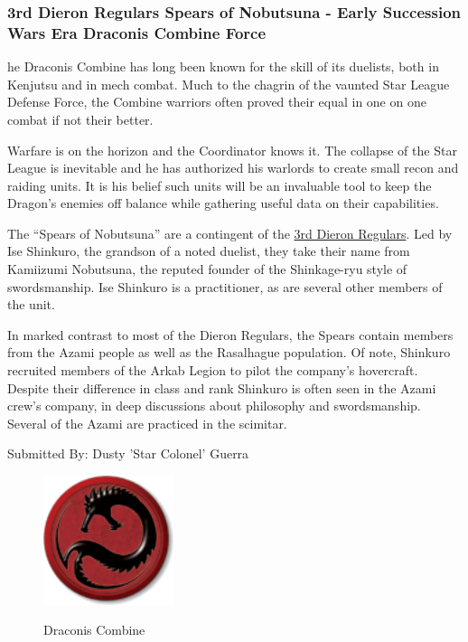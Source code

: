 \subsubsection{3rd Dieron Regulars Spears of Nobutsuna - Early Succession Wars Era Draconis Combine Force}

he Draconis Combine has long been known for the skill of its duelists, both in Kenjutsu and in mech combat.
Much to the chagrin of the vaunted Star League Defense Force, the Combine warriors often proved their equal in one on one combat if not their better.

Warfare is on the horizon and the Coordinator knows it.
The collapse of the Star League is inevitable and he has authorized his warlords to create small recon and raiding units.
It is his belief such units will be an invaluable tool to keep the Dragon’s enemies off balance while gathering useful data on their capabilities.

The “Spears of Nobutsuna” are a contingent of the \href{https://www.sarna.net/wiki/3rd_Dieron_Regulars}{3rd Dieron Regulars}.
Led by Ise Shinkuro, the grandson of a noted duelist, they take their name from Kamiizumi Nobutsuna, the reputed founder of the Shinkage-ryu style of swordsmanship.
Ise Shinkuro is a practitioner, as are several other members of the unit.

In marked contrast to most of the Dieron Regulars, the Spears contain members from the Azami people as well as the Rasalhague population.
Of note, Shinkuro recruited members of the Arkab Legion to pilot the company’s hovercraft.
Despite their difference in class and rank Shinkuro is often seen in the Azami crew’s company, in deep discussions about philosophy and swordsmanship.
Several of the Azami are practiced in the scimitar. 

Submitted By: Dusty 'Star Colonel' Guerra

\begin{figure}[!h]
  \centering
  \includegraphics[alt='Draconis Combine Logo', width=1.5in, height=1.486in]{img/Draconis-Combine.png}
  \caption*{Draconis Combine}
\end{figure}

